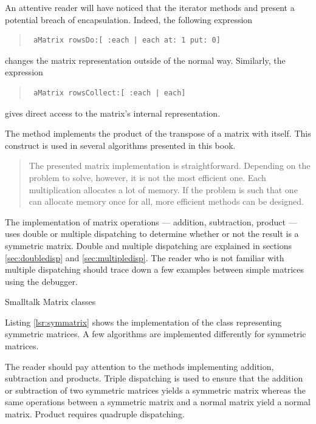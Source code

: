 An attentive reader will have noticed that the iterator methods
 and  present a potential breach of
encapsulation. Indeed, the following expression
\begin{quote}
\begin{verbatim}
 aMatrix rowsDo:[ :each | each at: 1 put: 0]
\end{verbatim}
\end{quote}
changes the matrix representation outside of the normal way.
Similarly, the expression
\begin{quote}
\begin{verbatim}
 aMatrix rowsCollect:[ :each | each]
\end{verbatim}
\end{quote}
gives direct access to the matrix's internal representation.

The method  implements the product of the transpose of
a matrix with itself. This construct is used in several algorithms
presented in this book.

\begin{quotation}
 The presented matrix implementation is
straightforward. Depending on the problem to solve, however, it is
not the most efficient one. Each multiplication allocates a lot of
memory. If the problem is such that one can allocate memory once
for all, more efficient methods can be designed.
\end{quotation}

The implementation of matrix operations --- addition, subtraction,
product --- uses double or multiple dispatching to determine
whether or not the result is a symmetric matrix. Double and
multiple dispatching are explained in sections
\ref{sec:doubledisp} and \ref{sec:multipledisp}. The reader who is
not familiar with multiple dispatching should trace down a few
examples between simple matrices using the debugger.


\begin{listing}[label=lst:matrix]{Smalltalk}
{Matrix classes}
%
\end{listing}

Listing \ref{lsr:symmatrix} shows the implementation of the class
 representing symmetric matrices. A few
algorithms are implemented differently for symmetric matrices.

The reader should pay attention to the methods implementing
addition, subtraction and products. Triple dispatching is used to
ensure that the addition or subtraction of two symmetric matrices
yields a symmetric matrix whereas the same operations between a
symmetric matrix and a normal matrix yield a normal matrix.
Product requires quadruple dispatching.

